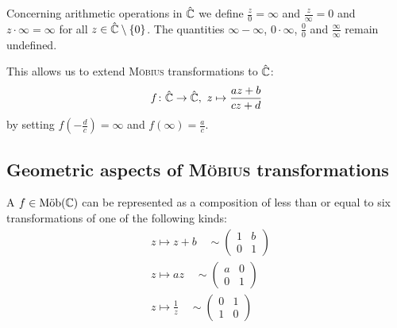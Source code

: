 \documentclass[a4paper,english]{article}
\begin{document}
Concerning arithmetic operations in $\hat{\CC}$ we define $\frac{z}{0} = \infty$ and $\frac{z}{\infty} = 0$ and $z \cdot \infty = \infty$ for all $z \in \hat{\CC} \setminus \{ 0 \}$.
The quantities $\infty - \infty$, $0 \cdot \infty$, $\frac{0}{0}$ and $\frac{\infty}{\infty}$ remain undefined.   

This allows us to extend \textsc{Möbius} transformations to $\hat{\CC}$:
\begin{equation*}
    f \colon \hat{\CC} \to \hat{\CC}, \ 
    z \mapsto \frac{a z + b}{c z + d}
\end{equation*}
by setting $f\left(-\frac{d}{c}\right) = \infty$ and $f(\infty) = \frac{a}{c}$.

\subsection{Geometric aspects of \textsc{Möbius} transformations}

\begin{lemma}
    A $f \in \Moeb(\CC)$ can be represented as a composition of less than or equal to six transformations of one of the following kinds:
    \begin{align*}
        & z \mapsto z + b \quad \sim \begin{pmatrix} 1 & b \\ 0 & 1 \end{pmatrix}  \tag{translation} \\
        & z \mapsto a z \quad \sim \begin{pmatrix} a & 0 \\ 0 & 1 \end{pmatrix}  \tag{dilation $+$ rotation} \\
        & z \mapsto \frac{1}{z} \quad \sim \begin{pmatrix} 0 & 1 \\ 1 & 0 \end{pmatrix}  \tag{inversion}
    \end{align*}
\end{lemma}
\end{document}
